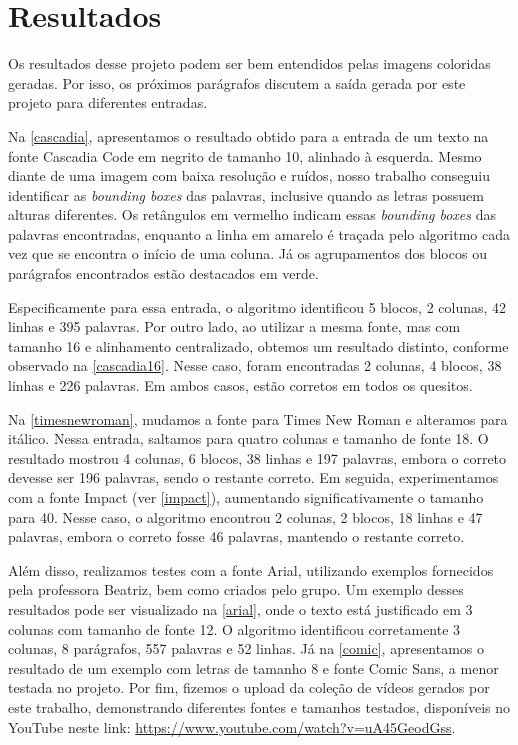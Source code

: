 \documentclass[english, 
               brazil, 
               bsc] %
               {dcomp-abntex2}
\begin{document}
\chapter{Resultados} \label{ch-resultados}
Os resultados desse projeto podem ser bem entendidos pelas imagens coloridas geradas. Por isso, os próximos parágrafos discutem a saída gerada por este projeto para diferentes entradas.


Na \autoref{cascadia}, apresentamos o resultado obtido para a entrada de um texto na fonte Cascadia Code em negrito de tamanho 10, alinhado à esquerda. Mesmo diante de uma imagem com baixa resolução e ruídos, nosso trabalho conseguiu identificar as \textit{bounding boxes} das palavras, inclusive quando as letras possuem alturas diferentes. Os retângulos em vermelho indicam essas \textit{bounding boxes} das palavras encontradas, enquanto a linha em amarelo é traçada pelo algoritmo cada vez que se encontra o início de uma coluna. Já os agrupamentos dos blocos ou parágrafos encontrados estão destacados em verde.


Especificamente para essa entrada, o algoritmo identificou 5 blocos, 2 colunas, 42 linhas e 395 palavras. Por outro lado, ao utilizar a mesma fonte, mas com tamanho 16 e alinhamento centralizado, obtemos um resultado distinto, conforme observado na \autoref{cascadia16}. Nesse caso, foram encontradas 2 colunas, 4 blocos, 38 linhas e 226 palavras. Em ambos casos, estão corretos em todos os quesitos.




Na \autoref{timesnewroman}, mudamos a fonte para Times New Roman e alteramos para itálico. Nessa entrada, saltamos para quatro colunas e tamanho de fonte 18. O resultado mostrou 4 colunas, 6 blocos, 38 linhas e 197 palavras, embora o correto devesse ser 196 palavras, sendo o restante correto. Em seguida, experimentamos com a fonte Impact (ver \autoref{impact}), aumentando significativamente o tamanho para 40. Nesse caso, o algoritmo encontrou 2 colunas, 2 blocos, 18 linhas e 47 palavras, embora o correto fosse 46 palavras, mantendo o restante correto.


Além disso, realizamos testes com a fonte Arial, utilizando exemplos fornecidos pela professora Beatriz, bem como criados pelo grupo. Um exemplo desses resultados pode ser visualizado na \autoref{arial}, onde o texto está justificado em 3 colunas com tamanho de fonte 12. O algoritmo identificou corretamente 3 colunas, 8 parágrafos, 557 palavras e 52 linhas. Já na \autoref{comic}, apresentamos o resultado de um exemplo com letras de tamanho 8 e fonte Comic Sans, a menor testada no projeto. Por fim, fizemos o upload da coleção de vídeos gerados por este trabalho, demonstrando diferentes fontes e tamanhos testados, disponíveis no YouTube neste link: \url{https://www.youtube.com/watch?v=uA45GeodGss}.
\end{document}
